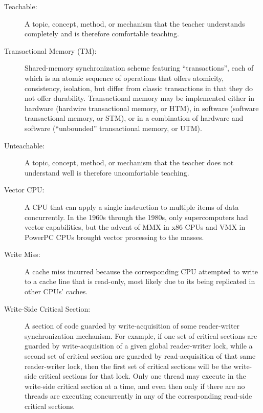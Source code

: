 \begin{description}
\item[Teachable:]
	A topic, concept, method, or mechanism that the teacher understands
	completely and is therefore comfortable teaching.
\item[Transactional Memory (TM):]
	Shared-memory synchronization scheme featuring ``transactions'',
	each of which is an atomic sequence of operations
	that offers atomicity, consistency, isolation, but differ from
	classic transactions in that they do not offer
	durability.
	Transactional memory may be implemented either in hardware
	(hardwire transactional memory, or HTM), in software (software
	transactional memory, or STM), or in a combination of hardware
	and software (``unbounded'' transactional memory, or UTM).
\item[Unteachable:]
	A topic, concept, method, or mechanism that the teacher does
	not understand well is therefore uncomfortable teaching.
\item[Vector CPU:]
	A CPU that can apply a single instruction to multiple items of
	data concurrently.
	In the 1960s through the 1980s, only supercomputers had vector
	capabilities, but the advent of MMX in x86 CPUs and VMX in
	PowerPC CPUs brought vector processing to the masses.
\item[Write Miss:]
	A cache miss incurred because the corresponding CPU attempted
	to write to a cache line that is read-only, most likely due
	to its being replicated in other CPUs' caches.
\item[Write-Side Critical Section:]
	A section of code guarded by write-acquisition of
	some reader-writer synchronization mechanism.
	For example, if one set of critical sections are guarded by
	write-acquisition of
	a given global reader-writer lock, while a second set of critical
	section are guarded by read-acquisition of that same reader-writer
	lock, then the first set of critical sections will be the
	write-side critical sections for that lock.
	Only one thread may execute in the write-side critical section
	at a time, and even then only if there are no threads are
	executing concurrently in any of the corresponding read-side
	critical sections.
\end{description}
